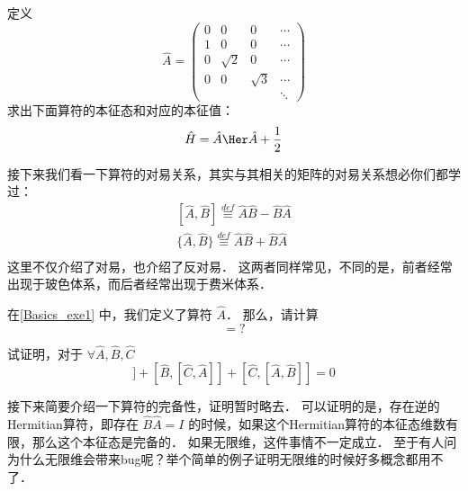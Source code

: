 \begin{exercise}{}\label{Basics_exe1}
定义
\begin{equation}
\hat{A} = \left(
\begin{matrix}
0 & 0 & 0 & \cdots \\
1 & 0 & 0 & \cdots \\
0 & \sqrt{2} & 0 & \cdots\\
0 & 0 & \sqrt{3} & \cdots\\
  &  &  &  \ddots
\end{matrix}
\right)
\end{equation}
求出下面算符的本征态和对应的本征值：
\begin{equation}
\hat{H} = \hat{A}\Her\hat{A} + \frac{1}{2}
\end{equation}
\end{exercise}

接下来我们看一下算符的对易关系，其实与其相关的矩阵的对易关系想必你们都学过：
\begin{equation}
\begin{split}
[\hat{A},\hat{B}] \overset{def}{\equiv}\hat{A}\hat{B} - \hat{B}\hat{A}\\
\{\hat{A},\hat{B}\} \overset{def}{\equiv}\hat{A}\hat{B} + \hat{B}\hat{A}\\
\end{split}
\end{equation}
这里不仅介绍了对易，也介绍了反对易． 这两者同样常见，不同的是，前者经常出现于玻色体系，而后者经常出现于费米体系．

\begin{exercise}{}
在\autoref{Basics_exe1} 中，我们定义了算符 $\hat{A}$． 那么，请计算
\begin{equation}
[\hat{A},\hat{A}\Her] = ?
\end{equation}
\end{exercise}

\begin{exercise}{}
试证明，对于 $\forall \hat{A}, \hat{B}, \hat{C}$
\begin{equation}
[\hat{A},[\hat{B},\hat{C}]] + [\hat{B},[\hat{C},\hat{A}]] + [\hat{C},[\hat{A},\hat{B}]] = 0
\end{equation}
\end{exercise}

接下来简要介绍一下算符的完备性，证明暂时略去． 可以证明的是，存在逆的Hermitian算符，即存在 $\hat{B}\hat{A} = I$ 的时候，如果这个Hermitian算符的本征态维数有限，那么这个本征态是完备的． 如果无限维，这件事情不一定成立． 至于有人问为什么无限维会带来bug呢？举个简单的例子证明无限维的时候好多概念都用不了．

